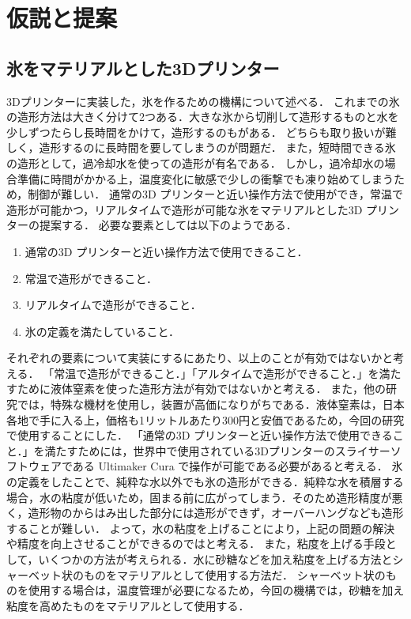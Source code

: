 \chapter{仮説と提案}
\label{chp:first}

\section{氷をマテリアルとした3Dプリンター}
\label{sec:paragraph}

3Dプリンターに実装した，氷を作るための機構について述べる．
これまでの氷の造形方法は大きく分けて2つある．大きな氷から切削して造形するものと水を少しずつたらし長時間をかけて，造形するのもがある．
どちらも取り扱いが難しく，造形するのに長時間を要してしまうのが問題だ．
また，短時間できる氷の造形として，過冷却水を使っての造形が有名である．
しかし，過冷却水の場合準備に時間がかかる上，温度変化に敏感で少しの衝撃でも凍り始めてしまうため，制御が難しい．
通常の3D プリンターと近い操作方法で使用ができ，常温で造形が可能かつ，リアルタイムで造形が可能な氷をマテリアルとした3D プリンターの提案する．
必要な要素としては以下のようである．

\begin{enumerate}
  \item 通常の3D プリンターと近い操作方法で使用できること． 
  \item 常温で造形ができること．
  \item リアルタイムで造形ができること．
  \item 氷の定義を満たしていること．
 \end{enumerate}

それぞれの要素について実装にするにあたり、以上のことが有効ではないかと考える．
「常温で造形ができること．」「アルタイムで造形ができること．」を満たすために液体窒素を使った造形方法が有効ではないかと考える．
また，他の研究では，特殊な機材を使用し，装置が高価になりがちである．液体窒素は，日本各地で手に入る上，価格も1リットルあたり300円と安価であるため，今回の研究で使用することにした．
「通常の3D プリンターと近い操作方法で使用できること．」を満たすためには，世界中で使用されている3Dプリンターのスライサーソフトウェアである Ultimaker Cura で操作が可能である必要があると考える．
氷の定義をしたことで、純粋な水以外でも氷の造形ができる．純粋な水を積層する場合，水の粘度が低いため，固まる前に広がってしまう．そのため造形精度が悪く，造形物のからはみ出した部分には造形ができず，オーバーハングなども造形することが難しい．
よって，水の粘度を上げることにより，上記の問題の解決や精度を向上させることができるのではと考える．
また，粘度を上げる手段として，いくつかの方法が考えられる．水に砂糖などを加え粘度を上げる方法とシャーベット状のものをマテリアルとして使用する方法だ．
シャーベット状のものを使用する場合は，温度管理が必要になるため，今回の機構では，砂糖を加え粘度を高めたものをマテリアルとして使用する．

